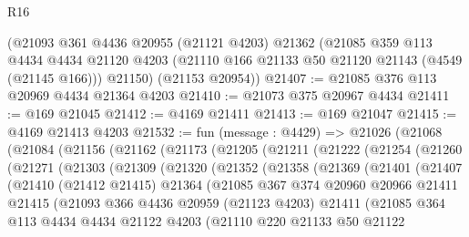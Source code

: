 \begin{lexlean}{R16}
\begin{coremodule}
    (@21093
      @361
      @4436
      @20955
      (@21121 @4203)
      @21362
      (@21085
        @359
        @113
        @4434
        @4434
        @21120
        @4203
        (@21110 @166 @21133 @50 @21120 @21143 (@4549 (@21145 @166)))
        @21150)
      (@21153 @20954))
@21407 := @21085 @376 @113 @20969 @4434 @21364 @4203
@21410 := @21073 @375 @20967 @4434
@21411 := @169 @21045
@21412 := @4169 @21411
@21413 := @169 @21047
@21415 := @4169 @21413 @4203
@21532 := fun (message : @4429) =>
  @21026
    (@21068
      (@21084
        (@21156
          (@21162
            (@21173
              (@21205
                (@21211
                  (@21222
                    (@21254
                      (@21260
                        (@21271
                          (@21303
                            (@21309
                              (@21320
                                (@21352
                                  (@21358
                                    (@21369
                                      (@21401
                                        (@21407
                                          (@21410
                                            (@21412 @21415)
                                            @21364
                                            (@21085
                                              @367
                                              @374
                                              @20960
                                              @20966
                                              @21411
                                              @21415
                                              (@21093
                                                @366
                                                @4436
                                                @20959
                                                (@21123 @4203)
                                                @21411
                                                (@21085
                                                  @364
                                                  @113
                                                  @4434
                                                  @4434
                                                  @21122
                                                  @4203
                                                  (@21110
                                                    @220
                                                    @21133
                                                    @50
                                                    @21122

\end{coremodule}
\end{lexlean}
